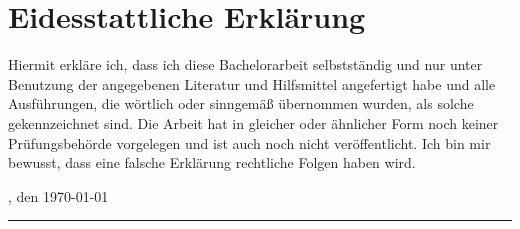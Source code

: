 
\chapter*{Eidesstattliche Erkl\"arung}
\label{cha:Erklaerung}

\thispagestyle{empty}

Hiermit erkl\"are ich, dass ich diese Bachelorarbeit selbstst\"andig und nur unter Benutzung der angegebenen Literatur und Hilfsmittel angefertigt habe und alle Ausf\"uhrungen, die w\"ortlich oder sinngem\"aß \"ubernommen wurden, als solche gekennzeichnet sind. 
Die Arbeit hat in gleicher oder \"ahnlicher Form noch keiner Prüfungsbeh\"orde vorgelegen und ist auch noch nicht ver\"offentlicht. 
Ich bin mir bewusst, dass eine falsche Erkl\"arung rechtliche Folgen haben wird.

\ort, den \today


\rule[-0.2cm]{5cm}{0.5pt}

\textsc{\autor} 
